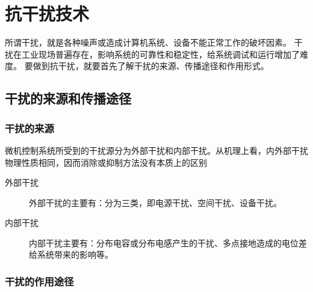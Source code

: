 
\chapter{抗干扰技术}

所谓干扰，就是各种噪声或造成计算机系统、设备不能正常工作的破坏因素。
干扰在工业现场普遍存在，影响系统的可靠性和稳定性，给系统调试和运行增加了难度。
要做到抗干扰，就要首先了解干扰的来源、传播途径和作用形式。




\section{干扰的来源和传播途径}


\subsection{干扰的来源}

微机控制系统所受到的干扰源分为外部干扰和内部干扰。从机理上看，内外部干扰物理性质相同，因而消除或抑制方法没有本质上的区别


\begin{description}
  \item[外部干扰]
       外部干扰的主要有：分为三类，即电源干扰、空间干扰、设备干扰。
  \item[内部干扰]
       内部干扰主要有：分布电容或分布电感产生的干扰、多点接地造成的电位差给系统带来的影响等。
\end{description}



\subsection{干扰的作用途径}


